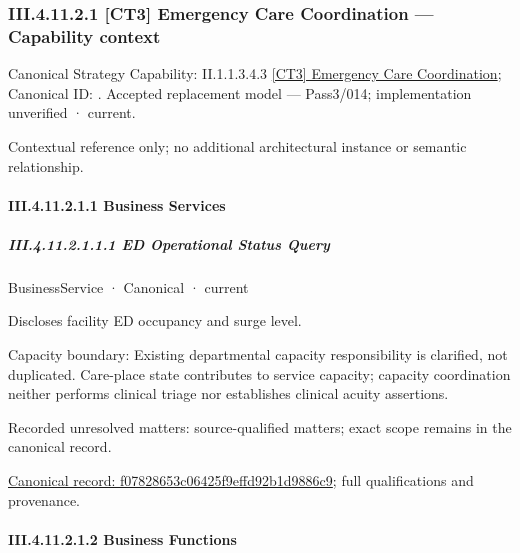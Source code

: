\subsubsection*{III.4.11.2.1 [CT3] Emergency Care Coordination — Capability context}
\label{navigation:III.4.11.2.1}

{\small Canonical Strategy Capability: II.1.1.3.4.3 \hyperref[element:22cb7ae4bd6b4c73aa2d8f5210eee460]{[CT3] Emergency Care Coordination}; Canonical ID: \texttt{}. Accepted replacement model — Pass3/014; implementation unverified · current.}\par
Contextual reference only; no additional architectural instance or semantic relationship.\par
\paragraph*{III.4.11.2.1.1 Business Services}
\label{navigation:III.4.11.2.1.1}

\subparagraph*{III.4.11.2.1.1.1 ED Operational Status Query}
\label{navigation:III.4.11.2.1.1.1}

\label{element:f07828653c06425f9effd92b1d9886c9}
{\small BusinessService · Canonical · current}\par

Discloses facility ED occupancy and surge level.



Capacity boundary: Existing departmental capacity responsibility is clarified, not duplicated. Care-place state contributes to service capacity; capacity coordination neither performs clinical triage nor establishes clinical acuity assertions.


{\small Recorded unresolved matters: source-qualified matters; exact scope remains in the canonical record.}\par
{\footnotesize \href{../../../../../../../continuum/business/business-service/f07828653c06425f9effd92b1d9886c9.md}{Canonical record: f07828653c06425f9effd92b1d9886c9}; full qualifications and provenance.}\par
\paragraph*{III.4.11.2.1.2 Business Functions}
\label{navigation:III.4.11.2.1.2}

